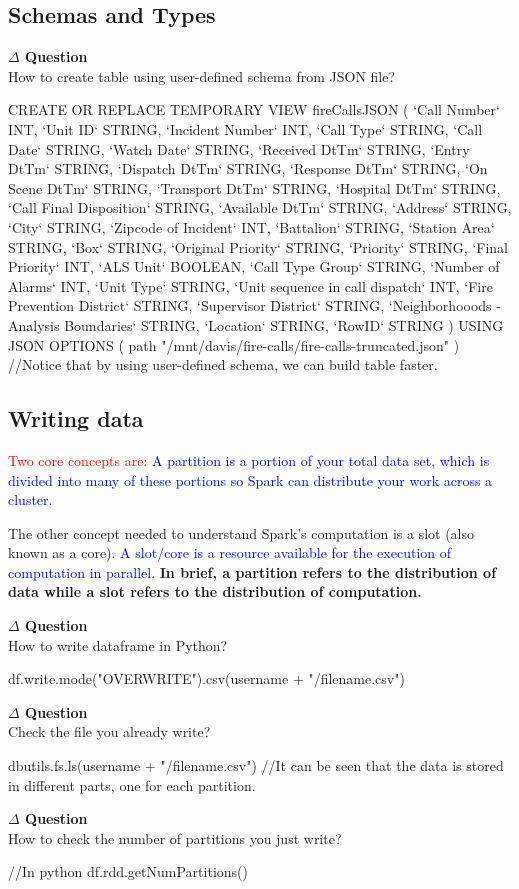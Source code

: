 \documentclass[12pt]{article}
\newenvironment{que}
    { \begin{mdframed}[backgroundcolor=green!20] \textbf{$\Delta$ Question} \\}
    {  \end{mdframed}}
\newcommand{\redp}[1]{\textcolor{red}{#1}}
\newcommand{\bluep}[1]{\textcolor{blue}{#1}}
\begin{document}
\subsection{Schemas and Types}
\begin{que}
How to create table using user-defined schema from JSON file?
\end{que}
\begin{code}
CREATE OR REPLACE TEMPORARY VIEW fireCallsJSON ( 
  `Call Number` INT,
  `Unit ID` STRING,
  `Incident Number` INT,
  `Call Type` STRING,
  `Call Date` STRING,
  `Watch Date` STRING,
  `Received DtTm` STRING,
  `Entry DtTm` STRING,
  `Dispatch DtTm` STRING,
  `Response DtTm` STRING,
  `On Scene DtTm` STRING,
  `Transport DtTm` STRING,
  `Hospital DtTm` STRING,
  `Call Final Disposition` STRING,
  `Available DtTm` STRING,
  `Address` STRING,
  `City` STRING,
  `Zipcode of Incident` INT,
  `Battalion` STRING,
  `Station Area` STRING,
  `Box` STRING,
  `Original Priority` STRING,
  `Priority` STRING,
  `Final Priority` INT,
  `ALS Unit` BOOLEAN,
  `Call Type Group` STRING,
  `Number of Alarms` INT,
  `Unit Type` STRING,
  `Unit sequence in call dispatch` INT,
  `Fire Prevention District` STRING,
  `Supervisor District` STRING,
  `Neighborhooods - Analysis Boundaries` STRING,
  `Location` STRING,
  `RowID` STRING
)
USING JSON 
OPTIONS (
    path "/mnt/davis/fire-calls/fire-calls-truncated.json"
)
//Notice that by using user-defined schema, we can build table faster.
\end{code}

\subsection{Writing data}
\redp{Two core concepts are:} \bluep{A partition is a portion of your total data set, which is divided into many of these portions so Spark can distribute your work across a cluster.}

The other concept needed to understand Spark's computation is a slot (also known as a core). \bluep{A slot/core is a resource available for the execution of computation in parallel}. \textbf{In brief, a partition refers to the distribution of data while a slot refers to the distribution of computation.}
\begin{que}
How to write dataframe in Python?
\end{que}
\begin{code}
df.write.mode("OVERWRITE").csv(username + "/filename.csv")
\end{code}
\begin{que}
Check the file you already write?
\end{que}
\begin{code}
dbutils.fs.ls(username + "/filename.csv")
//It can be seen that the data is stored in different parts, one for each partition.
\end{code}
\begin{que}
How to check the number of partitions you just write?
\end{que}
\begin{code}
//In python
df.rdd.getNumPartitions()
\end{code}
\end{document}
